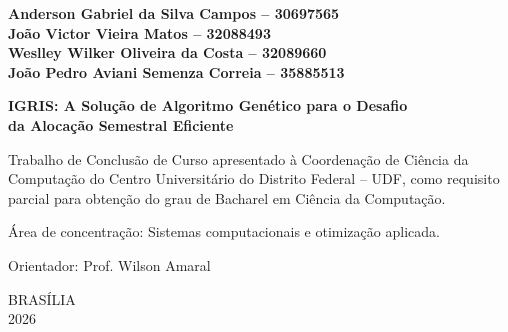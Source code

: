 \newpage
\thispagestyle{empty}  %

\begin{center}
{\normalsize\bfseries
  Anderson Gabriel da Silva Campos -- 30697565\\[0.2cm]
  João Victor Vieira Matos -- 32088493\\[0.2cm]
  Weslley Wilker Oliveira da Costa -- 32089660\\[0.2cm]
  João Pedro Aviani Semenza Correia -- 35885513
}

\vspace{3cm}

{\Large\bfseries
  IGRIS: A Solução de Algoritmo Genético para o Desafio\\
  da Alocação Semestral Eficiente
}
\end{center}

\vspace{3cm}

\begin{flushright}
  \begin{minipage}{0.5\textwidth}
    \normalsize
    Trabalho de Conclusão de Curso apresentado à
    Coordenação de Ciência da Computação do Centro
    Universitário do Distrito Federal -- UDF, como
    requisito parcial para obtenção do grau de
    Bacharel em Ciência da Computação.

    \vspace{0.5cm}
    Área de concentração: Sistemas computacionais e
    otimização aplicada.

    \vspace{0.5cm}
    Orientador: Prof. Wilson Amaral
  \end{minipage}
\end{flushright}

\vfill
\begin{center}
{\normalsize BRASÍLIA\\2026}
\end{center}
